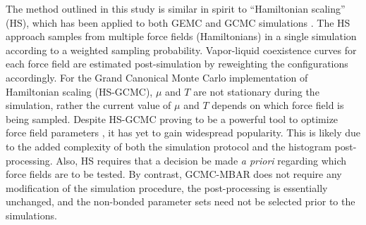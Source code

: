 \documentclass[journal=jced,manuscript=article]{achemso}
\begin{document}
The method outlined in this study is similar in spirit to ``Hamiltonian scaling'' (HS), which has been applied to both GEMC \cite{Kiyohara1996} and GCMC simulations \cite{Errington1998,Exp6,Errington1999,Pana2000}. The HS approach samples from multiple force fields (Hamiltonians) in a single simulation according to a weighted sampling probability. Vapor-liquid coexistence curves for each force field are estimated post-simulation by reweighting the configurations accordingly. For the Grand Canonical Monte Carlo implementation of Hamiltonian scaling (HS-GCMC), $\mu$ and $T$ are not stationary during the simulation, rather the current value of $\mu$ and $T$ depends on which force field is being sampled. Despite HS-GCMC proving to be a powerful tool to optimize force field parameters \cite{Errington1998,Exp6,Errington1999,Pana2000}, it has yet to gain widespread popularity. This is likely due to the added complexity of both the simulation protocol and the histogram post-processing. Also, HS requires that a decision be made \textit{a priori} regarding which force fields are to be tested. By contrast, GCMC-MBAR does not require any modification of the simulation procedure, the post-processing is essentially unchanged, and the non-bonded parameter sets need not be selected prior to the simulations.


\end{document}
